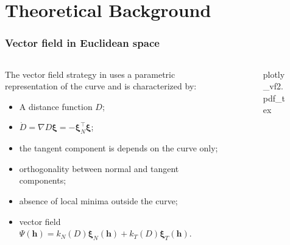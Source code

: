 
\section{Theoretical Background}

\begin{frame}
    \frametitle{Vector field in Euclidean space}
    \begin{columns}[c]
        \begin{column}{7cm}
            The vector field strategy in \citet{Rezende2022} uses a parametric representation of the curve and is characterized by:
            \begin{itemize}
                \item A distance function $D$;
                \item $\dot{D}=\nabla D\boldsymbol{\xi}=-\boldsymbol{\xi}_N^\top\boldsymbol{\xi}$;
                \item the tangent component is depends on the curve only;
                \item orthogonality between normal and tangent components;
                \item absence of local minima outside the curve;
                \item vector field $\Psi(\mathbf{h})=k_N(D)\boldsymbol{\xi}_N(\mathbf{h}) + k_T(D)\boldsymbol{\xi}_T(\mathbf{h})$.
            \end{itemize}
            
        \end{column}
        \begin{column}{8cm}
           \begin{figure}[ht!]
            \centering
            \def\svgwidth{\linewidth}
            {\footnotesize{plotly_vf2.pdf_tex}}
        \end{figure}
        \end{column}
    \end{columns}
\end{frame}